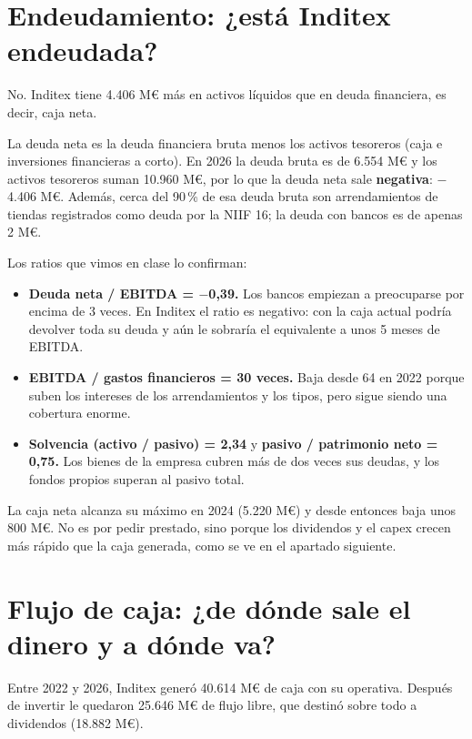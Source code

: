 \documentclass[11pt,a4paper]{article}
\newcommand{\mn}{\ensuremath{-}}                 %
\newcommand{\idea}[1]{\begin{ideabox}#1\end{ideabox}}
\begin{document}
\section{Endeudamiento: ¿está Inditex endeudada?}

\idea{No. Inditex tiene 4.406 M€ más en activos líquidos que en deuda financiera, es decir, caja neta.}

La deuda neta es la deuda financiera bruta menos los activos tesoreros (caja e inversiones
financieras a corto). En 2026 la deuda bruta es de 6.554 M€ y los activos tesoreros suman
10.960 M€, por lo que la deuda neta sale \textbf{negativa}: \mn4.406 M€. Además, cerca del 90\,\% de esa
deuda bruta son arrendamientos de tiendas registrados como deuda por la NIIF 16; la deuda con bancos es
de apenas 2 M€.

Los ratios que vimos en clase lo confirman:
\begin{itemize}
  \item \textbf{Deuda neta / EBITDA = \mn0,39.} Los bancos empiezan a preocuparse por encima de 3 veces.
        En Inditex el ratio es negativo: con la caja actual podría devolver toda su deuda y aún le sobraría
        el equivalente a unos 5 meses de EBITDA.
  \item \textbf{EBITDA / gastos financieros = 30 veces.} Baja desde 64 en 2022 porque suben los intereses de
        los arrendamientos y los tipos, pero sigue siendo una cobertura enorme.
  \item \textbf{Solvencia (activo / pasivo) = 2,34} y \textbf{pasivo / patrimonio neto = 0,75.} Los bienes de la
        empresa cubren más de dos veces sus deudas, y los fondos propios superan al pasivo total.
\end{itemize}

La caja neta alcanza su máximo en 2024 (5.220 M€) y desde entonces baja unos 800 M€. No es por pedir
prestado, sino porque los dividendos y el capex crecen más rápido que la caja generada, como se ve
en el apartado siguiente.

\section{Flujo de caja: ¿de dónde sale el dinero y a dónde va?}

\idea{Entre 2022 y 2026, Inditex generó 40.614 M€ de caja con su operativa. Después de invertir le
quedaron 25.646 M€ de flujo libre, que destinó sobre todo a dividendos (18.882 M€).}
\end{document}
